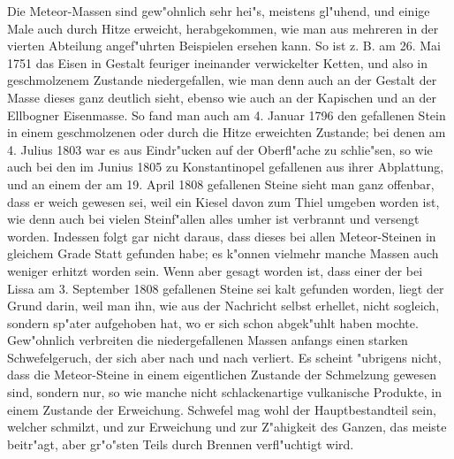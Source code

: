 \documentclass[a4paper, 11pt, oneside, polutonikogreek, german]{article}
\begin{document}
Die Meteor-Massen sind gew"ohnlich sehr hei"s, meistens gl"uhend, und einige Male auch durch Hitze erweicht, herabgekommen, wie man aus mehreren in der vierten Abteilung angef"uhrten Beispielen ersehen kann. So ist z. B. am 26. Mai 1751 das Eisen in Gestalt feuriger ineinander verwickelter Ketten, und also in geschmolzenem Zustande niedergefallen, wie man denn auch an der Gestalt der Masse dieses ganz deutlich sieht, ebenso wie auch an der Kapischen und an der Ellbogner Eisenmasse. So fand man auch am 4. Januar 1796 den gefallenen Stein in einem geschmolzenen oder durch die Hitze erweichten Zustande; bei denen am 4. Julius 1803 war es aus Eindr"ucken auf der Oberfl"ache zu schlie"sen, so wie auch bei den im Junius 1805 zu Konstantinopel gefallenen aus ihrer Abplattung, und an einem der am 19. April 1808 gefallenen Steine sieht man ganz offenbar, dass er weich gewesen sei, weil ein Kiesel davon zum Thiel umgeben worden ist, wie denn auch bei vielen Steinf"allen alles umher ist verbrannt und versengt worden. Indessen folgt gar nicht daraus, dass dieses bei allen Meteor-Steinen in gleichem Grade Statt gefunden habe; es k"onnen vielmehr manche Massen auch weniger erhitzt worden sein. Wenn aber gesagt worden ist, dass einer der bei Lissa am 3. September 1808 gefallenen Steine sei kalt gefunden worden, liegt der Grund darin, weil man ihn, wie aus der Nachricht selbst erhellet, nicht sogleich, sondern sp"ater aufgehoben hat, wo er sich schon abgek"uhlt haben mochte. Gew"ohnlich verbreiten die niedergefallenen Massen anfangs einen starken Schwefelgeruch, der sich aber nach und nach verliert. Es scheint "ubrigens nicht, dass die Meteor-Steine in einem eigentlichen Zustande der Schmelzung gewesen sind, sondern nur, so wie manche nicht schlackenartige vulkanische Produkte, in einem Zustande der Erweichung. Schwefel mag wohl der Hauptbestandteil sein, welcher schmilzt, und zur Erweichung und zur Z"ahigkeit des Ganzen, das meiste beitr"agt, aber gr"o"sten Teils durch Brennen verfl"uchtigt wird.
\end{document}

